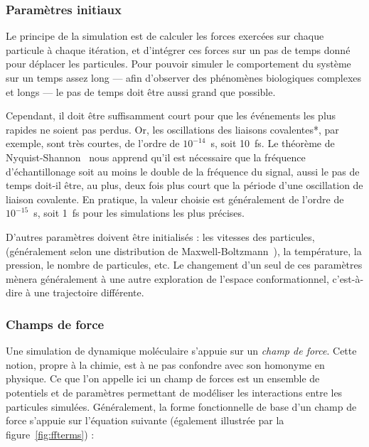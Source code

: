 	\subsubsection{Paramètres initiaux} Le principe de la simulation est de calculer les forces exercées sur chaque particule à chaque itération, et d'intégrer ces forces sur un pas de temps donné pour déplacer les particules. Pour pouvoir simuler le comportement du système sur un temps assez long --- afin d'observer des phénomènes biologiques complexes et longs --- le pas de temps doit être aussi grand que possible.
	
	Cependant, il doit être suffisamment court pour que les événements les plus rapides ne soient pas perdus. Or, les oscillations des liaisons covalentes*, par exemple, sont très courtes, de l'ordre de $10^{-14}$~s, soit 10~fs\footnotemark{}. Le théorème de Nyquist-Shannon~\cite{shannon1949communication} nous apprend qu'il est nécessaire que la fréquence d'échantillonage soit au moins le double de la fréquence du signal, aussi le pas de temps doit-il être, au plus, deux fois plus court que la période d'une oscillation de liaison covalente. En pratique, la valeur choisie est généralement de l'ordre de $10^{-15}$~s, soit 1~fs pour les simulations les plus précises.
	
	
	D'autres paramètres doivent être initialisés : les vitesses des particules, (généralement selon une distribution de Maxwell-Boltzmann~\cite{maxwell1860v, maxwell1860ii, boltzmann1970weitere, boltzmann2003further}), la température, la pression, le nombre de particules, etc. Le changement d'un seul de ces paramètres mènera généralement à une autre exploration de l'espace conformationnel, c'est-à-dire à une trajectoire différente.
	
	\subsubsection{Champs de force}
	Une simulation de dynamique moléculaire s'appuie sur un \emph{champ de force}. Cette notion, propre à la chimie, est à ne pas confondre avec son homonyme en physique. Ce que l'on appelle ici un champ de forces est un ensemble de potentiels et de paramètres permettant de modéliser les interactions entre les particules simulées. Généralement, la forme fonctionnelle de base d'un champ de force s'appuie sur l'équation suivante (également illustrée par la figure~\ref{fig:ffterms}) :
	
